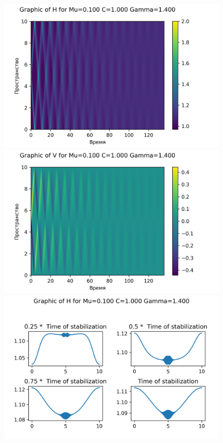 \begin{figure}[H]
	\centering
	\includegraphics[scale=0.5]{../graphs_data_nonsmooth_1/value/Graph_H_mu0.100_C1.000_gamma1.400.png}
	\includegraphics[scale=0.5]{../graphs_data_nonsmooth_1/value/Graph_V_mu0.100_C1.000_gamma1.400.png}	
	\includegraphics[scale=0.5]{../graphs_data_nonsmooth_1/slices/Graph_H_mu0.100_C1.000_gamma1.400.png}

\end{figure}
